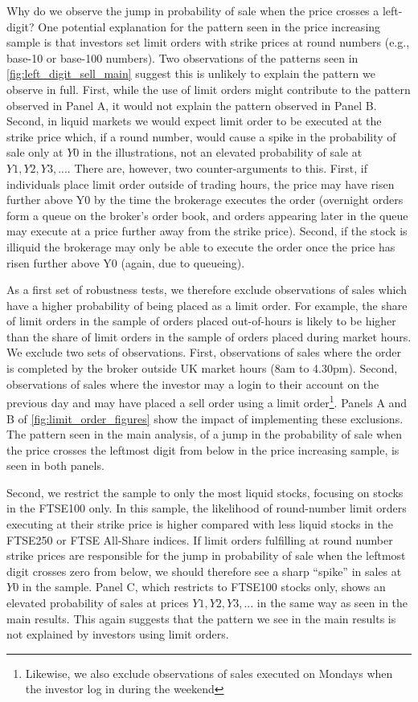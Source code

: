 Why do we observe the jump in probability of sale when the price crosses a left-digit? One potential explanation for the pattern seen in the price increasing sample is that investors set limit orders with strike prices at round numbers (e.g., base-10 or base-100 numbers). Two observations of the patterns seen in \ref{fig:left_digit_sell_main} suggest this is unlikely to explain the pattern we observe in full. First, while the use of limit orders might contribute to the pattern observed in Panel A, it would not explain the pattern observed in Panel B. Second, in liquid markets we would expect limit order to be executed at the strike price which, if a round number, would cause a spike in the probability of sale only at $Y0$ in the illustrations, not an elevated probability of sale at $Y1, Y2, Y3, ...$. There are, however, two counter-arguments to this. First, if individuals place limit order outside of trading hours, the price may have risen further above Y0 by the time the brokerage executes the order (overnight orders form a queue on the broker's order book, and orders appearing later in the queue may execute at a price further away from the strike price). Second, if the stock is illiquid the brokerage may only be able to execute the order once the price has risen further above Y0 (again, due to queueing). 

As a first set of robustness tests, we therefore exclude observations of sales which have a higher probability of being placed as a limit order. For example, the share of limit orders in the sample of orders placed out-of-hours is likely to be higher than the share of limit orders in the sample of orders placed during market hours. We exclude two sets of observations. First, observations of sales where the order is completed by the broker outside UK market hours (8am to 4.30pm). Second, observations of sales where the investor may a login to their account on the previous day and may have placed a sell order using a limit order\footnote{Likewise, we also exclude observations of sales executed on Mondays when  the investor log in during the weekend}. Panels A and B of \ref{fig:limit_order_figures} show the impact of implementing these exclusions. The pattern seen in the main analysis, of a jump in the probability of sale when the price crosses the leftmost digit from below in the price increasing sample, is seen in both panels.

Second, we restrict the sample to only the most liquid stocks, focusing on stocks in the FTSE100 only. In this sample, the likelihood of round-number limit orders executing at their strike price is higher compared with less liquid stocks in the FTSE250 or FTSE All-Share indices. If limit orders fulfilling at round number strike prices are responsible for the jump in probability of sale when the leftmost digit crosses zero from below, we should therefore see a sharp ``spike'' in sales at $Y0$ in the sample. Panel C, which restricts to FTSE100 stocks only, shows an elevated probability of sales at prices $Y1, Y2, Y3, ...$ in the same way as seen in the main results. This again suggests that the pattern we see in the main results is not explained by investors using limit orders.

